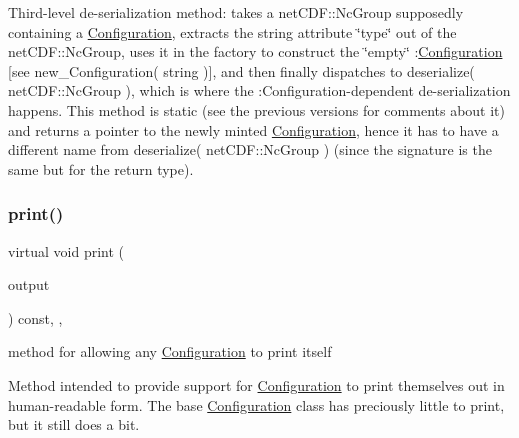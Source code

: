 Third-\/level de-\/serialization method\+: takes a net\+C\+D\+F\+::\+Nc\+Group supposedly containing a \mbox{\hyperlink{class_s_m_spp__di__unipi__it_1_1_configuration}{Configuration}}, extracts the string attribute \char`\"{}type\char`\"{} out of the net\+C\+D\+F\+::\+Nc\+Group, uses it in the factory to construct the \char`\"{}empty\char`\"{} \+:\mbox{\hyperlink{class_s_m_spp__di__unipi__it_1_1_configuration}{Configuration}} \mbox{[}see new\+\_\+\+Configuration( string )\mbox{]}, and then finally dispatches to deserialize( net\+C\+D\+F\+::\+Nc\+Group ), which is where the \+:Configuration-\/dependent de-\/serialization happens. This method is static (see the previous versions for comments about it) and returns a pointer to the newly minted \mbox{\hyperlink{class_s_m_spp__di__unipi__it_1_1_configuration}{Configuration}}, hence it has to have a different name from deserialize( net\+C\+D\+F\+::\+Nc\+Group ) (since the signature is the same but for the return type). \mbox{\label{class_s_m_spp__di__unipi__it_1_1_configuration_a2e7b9c9148a98c5c342e8c25cac95926}} 
\subsubsection{\texorpdfstring{print()}{print()}}
{\footnotesize\ttfamily virtual void print (\begin{DoxyParamCaption}\item[{std\+::ostream \&}]{output }\end{DoxyParamCaption}) const\hspace{0.3cm}{\ttfamily [inline]}, {\ttfamily [protected]}, {\ttfamily [virtual]}}



method for allowing any \mbox{\hyperlink{class_s_m_spp__di__unipi__it_1_1_configuration}{Configuration}} to print itself 

Method intended to provide support for \mbox{\hyperlink{class_s_m_spp__di__unipi__it_1_1_configuration}{Configuration}} to print themselves out in human-\/readable form. The base \mbox{\hyperlink{class_s_m_spp__di__unipi__it_1_1_configuration}{Configuration}} class has preciously little to print, but it still does a bit. 

